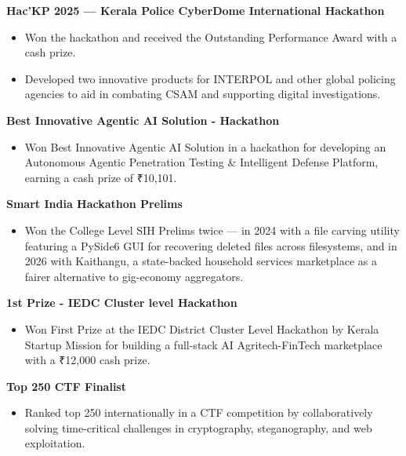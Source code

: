 \documentclass[10pt, a4paper]{article}
\newenvironment{highlights}{
    \begin{itemize}[
        topsep=0.10 cm,
        parsep=0.10 cm,
        partopsep=0pt,
        itemsep=0pt,
        leftmargin=0 cm + 10pt
    ]
}{
    \end{itemize}
} %
\begin{document}
                    \textbf{Hac'KP 2025 — Kerala Police CyberDome International Hackathon}
                \begin{highlights}
                    \item Won the hackathon and received the Outstanding Performance Award with a cash prize.
                    \item Developed two innovative products for INTERPOL and other global policing agencies to aid in combating CSAM and supporting digital investigations.
                \end{highlights}

                \textbf{Best Innovative Agentic AI Solution - Hackathon}
                \begin{highlights}
                    \item Won Best Innovative Agentic AI Solution in a hackathon for developing an Autonomous Agentic Penetration Testing \& Intelligent Defense Platform, earning a cash prize of ₹10,101.
                \end{highlights}

                
                \textbf{Smart India Hackathon Prelims}
                \begin{highlights}
                    \item Won the College Level SIH Prelims twice — in 2024 with a file carving utility featuring a PySide6 GUI for recovering deleted files across filesystems, and in 2026 with Kaithangu, a state-backed household services marketplace as a fairer alternative to gig-economy aggregators.
                \end{highlights}

              \textbf{1st Prize - IEDC Cluster level Hackathon}
              \begin{highlights}
                  \item Won First Prize at the IEDC District Cluster Level Hackathon by Kerala Startup Mission for building a full-stack AI Agritech-FinTech marketplace with a ₹12,000 cash prize.
              \end{highlights}

            \textbf{Top 250 CTF Finalist}
            \begin{highlights}
                \item Ranked top 250 internationally in a CTF competition by collaboratively solving time-critical challenges in cryptography, steganography, and web exploitation.
            \end{highlights}
                
\end{document}
